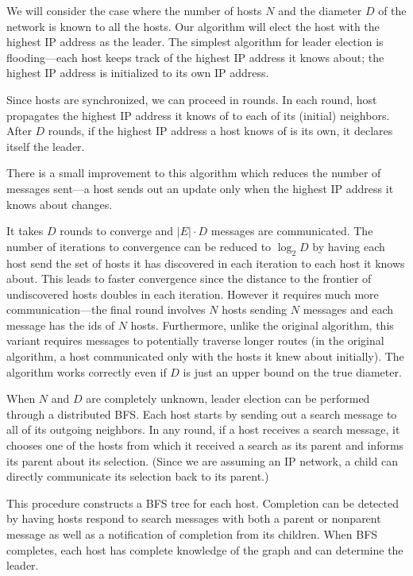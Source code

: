 We will consider the case where the number of hosts $N$ and
the diameter $D$ of the network is known to all the hosts. 
Our algorithm will elect the host with the highest IP address as the
leader.
The simplest algorithm for leader election is flooding---each
host keeps track of the highest IP address it
knows about; the highest IP address is initialized to
its own IP address.

Since hosts are synchronized, we can proceed in rounds.
In each round, host propagates the highest IP address
it knows of to each of its (initial) neighbors. After 
$D$ rounds, if the highest IP address a host knows of is
its own, it declares itself the leader.

There is a small improvement to this algorithm which reduces
the number of messages sent---a host sends out an update
only when the highest IP address it knows about changes.

It takes $D$ rounds to converge and $|E|\cdot D$ messages are
communicated.
The number of iterations to convergence can be reduced
to $\log_2 D$ by having each host send the set
of hosts it has discovered in each iteration to each
host it knows about. This leads to faster convergence
since the distance to the frontier of undiscovered hosts
doubles in each iteration. However it requires much
more communication---the final round involves $N$
hosts sending $N$ messages and each message
has the ids of $N$ hosts. Furthermore, unlike the
original algorithm, this variant requires messages
to potentially traverse longer routes (in the original
algorithm, a host communicated only with the hosts it knew about initially).
The algorithm works correctly even if $D$ is just an upper bound on the true diameter.

When $N$ and $D$ are completely unknown, leader election can be performed through a distributed BFS.
Each host starts by sending out a search message to all
of its outgoing neighbors. In any round, if a host
receives a search message, it chooses one of the 
hosts from which it received a search as its parent and
informs its parent about its selection.
(Since we are assuming an IP network, a child
can directly communicate its selection back
to its parent.)

This procedure constructs a BFS tree for each host. 
Completion can be detected by having hosts respond 
to search messages with both a parent or nonparent message
as well as a notification of completion from its children.
When BFS completes, each host has complete knowledge
of the graph and can determine the leader.

